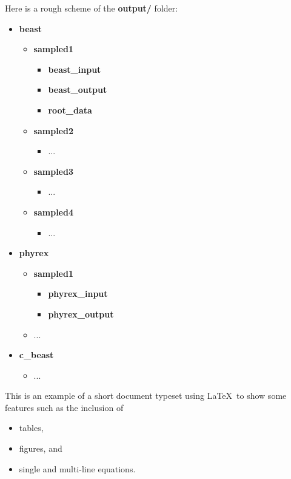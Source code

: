Here is a rough scheme of the \textbf{output/} folder:
\begin{itemize}
\item \textbf{beast}
\begin{itemize}
\item \textbf{sampled1}
\begin{itemize}
\item \textbf{beast\_input}
\item \textbf{beast\_output}
\item \textbf{root\_data}
\end{itemize}
\item \textbf{sampled2}
\begin{itemize}
\item ...
\end{itemize}
\item \textbf{sampled3}
\begin{itemize}
\item ...
\end{itemize}
\item \textbf{sampled4}
\begin{itemize}
\item ...
\end{itemize}
\end{itemize}

\item \textbf{phyrex}
\begin{itemize}
\item \textbf{sampled1}
\begin{itemize}
\item \textbf{phyrex\_input}
\item \textbf{phyrex\_output}
\end{itemize}
\item ...

\end{itemize}

\item \textbf{c\_beast}
\begin{itemize}
\item ...
\end{itemize}





\end{itemize}

\clearpage


This is an example of a short document typeset using \LaTeX\ to show
some features such as the inclusion of
\begin{itemize}
\item tables,
\item figures, and
\item single and multi-line equations.
\end{itemize}

